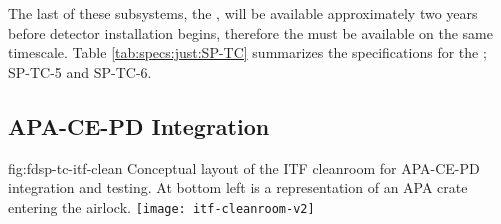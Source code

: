 The last of these subsystems, the , will be available approximately two years before detector installation begins, therefore the  must be available on the same timescale. 
Table \ref{tab:specs:just:SP-TC} summarizes the specifications for the ;  SP-TC-5 and SP-TC-6.






\subsection{APA-CE-PD Integration}
\label{sec:fdsp-tc-itf-integ}

\begin{dunefigure}{fig:fdsp-tc-itf-clean}
{Conceptual layout of the ITF cleanroom for APA-CE-PD integration and testing. At bottom left is a representation of an APA crate entering the airlock.}
\texttt{[image: itf-cleanroom-v2]}
\end{dunefigure}

